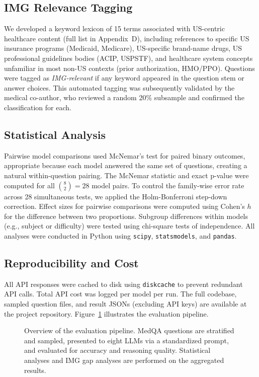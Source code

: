 \subsection{IMG Relevance Tagging}

We developed a keyword lexicon of 15 terms associated with US-centric healthcare content (full list in Appendix~D), including references to specific US insurance programs (Medicaid, Medicare), US-specific brand-name drugs, US professional guidelines bodies (ACIP, USPSTF), and healthcare system concepts unfamiliar in most non-US contexts (prior authorization, HMO/PPO). Questions were tagged as \textit{IMG-relevant} if any keyword appeared in the question stem or answer choices. This automated tagging was subsequently validated by the medical co-author, who reviewed a random 20\% subsample and confirmed the classification for each.

\subsection{Statistical Analysis}

Pairwise model comparisons used McNemar's test for paired binary outcomes, appropriate because each model answered the same set of questions, creating a natural within-question pairing. The McNemar statistic and exact p-value were computed for all $\binom{8}{2} = 28$ model pairs. To control the family-wise error rate across 28 simultaneous tests, we applied the Holm-Bonferroni step-down correction. Effect sizes for pairwise comparisons were computed using Cohen's $h$ for the difference between two proportions. Subgroup differences within models (e.g., subject or difficulty) were tested using chi-square tests of independence. All analyses were conducted in Python using \texttt{scipy}, \texttt{statsmodels}, and \texttt{pandas}.

\subsection{Reproducibility and Cost}

All API responses were cached to disk using \texttt{diskcache} to prevent redundant API calls. Total API cost was logged per model per run. The full codebase, sampled question files, and result JSONs (excluding API keys) are available at the project repository. Figure~\ref{fig:pipeline} illustrates the evaluation pipeline.

\begin{figure}[htbp]
\centering

\caption{Overview of the evaluation pipeline. MedQA questions are stratified and sampled, presented to eight LLMs via a standardized prompt, and evaluated for accuracy and reasoning quality. Statistical analyses and IMG gap analyses are performed on the aggregated results.}
\label{fig:pipeline}
\end{figure}
